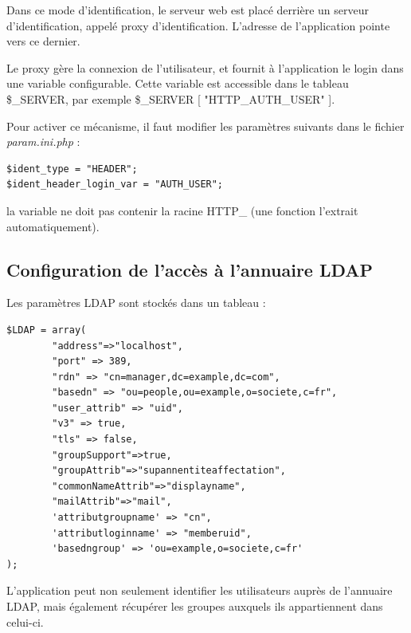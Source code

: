 Dans ce mode d'identification, le serveur web est placé derrière un serveur d'identification, appelé proxy d'identification. L'adresse de l'application pointe vers ce dernier. 

Le proxy gère la connexion de l'utilisateur, et fournit à l'application le login dans une variable configurable. Cette variable est accessible dans le tableau \$\_SERVER, par exemple \$\_SERVER [ "HTTP\_AUTH\_USER" ].

Pour activer ce mécanisme, il faut modifier les paramètres suivants dans le fichier \textit{param.ini.php} :
\begin{lstlisting}
$ident_type = "HEADER";
$ident_header_login_var = "AUTH_USER";
\end{lstlisting}

la variable ne doit pas contenir la racine HTTP\_ (une fonction l'extrait automatiquement).

\subsection{Configuration de l'accès à l'annuaire LDAP}

Les paramètres LDAP sont stockés dans un tableau :
\begin{lstlisting}
$LDAP = array(
		"address"=>"localhost",
		"port" => 389,
		"rdn" => "cn=manager,dc=example,dc=com",
		"basedn" => "ou=people,ou=example,o=societe,c=fr",
		"user_attrib" => "uid",
		"v3" => true,
		"tls" => false,
		"groupSupport"=>true,
		"groupAttrib"=>"supannentiteaffectation",
		"commonNameAttrib"=>"displayname",
		"mailAttrib"=>"mail",
		'attributgroupname' => "cn",
		'attributloginname' => "memberuid",
		'basedngroup' => 'ou=example,o=societe,c=fr'
);
\end{lstlisting}


L'application peut non seulement identifier les utilisateurs auprès de l'annuaire LDAP, mais également récupérer les groupes auxquels ils appartiennent dans celui-ci.

